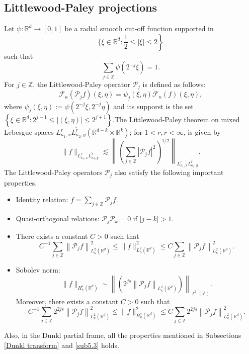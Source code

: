 \documentclass[a4paper,11pt, reqno]{amsart}
\theoremstyle{definition}
\theoremstyle{remark}
\numberwithin{equation}{section}
\newcommand{\K}{\kappa }
\begin{document}
\subsection{Littlewood-Paley projections}\label{L-P section}
Let $\psi: \mathbb{R}^{d} \rightarrow[0,1]$ be a radial smooth cut-off function supported in $$\{ \xi \in\left.\mathbb{R}^{d}  : \frac{1}{2} \leq|\xi | \leq 2\right\}$$ such that
	$$
	\sum_{j \in \mathbb{Z}} \psi\left(2^{-j} \xi \right)=1.
	$$
   For $j \in \mathbb{Z}$, the Littlewood-Paley operator $\mathcal{P}_j$ is defined as follows:
	$$
	\mathcal{F}_\kappa(\mathcal{P}_jf)(\xi,\eta)=\psi_j(\xi,\eta) \mathcal{F}_\kappa(f)(\xi,\eta),
	$$
	where $\psi_j(\xi,\eta):=\psi\left(2^{-j}\xi,2^{-j}\eta\right)$  and its supporst is the set  $\left\{\xi\in \mathbb{R}^d: 2^{j-1} \leq|(\xi,\eta) | \leq 2^{j+1}\right\}$.The Littlewood-Paley theorem  on mixed Lebesgue spaces $L^r_{{\K_1,x}}L^{\tilde{r}}_{\K_2,y}(\mathbb{R}^{d-k} \times \mathbb{R}^k) $; for $1<r, \tilde{r}<\infty$,
	is given by 	\begin{equation} \label{DLP}
	    \|f\|_{L^r_{{\K_1,x}}L^{\tilde{r}}_{\K_2,y} }\lesssim\left\| \left(\sum_{j \in \mathbb{Z}} \left|\mathcal{P}_j f\right|^2\right)^{1 / 2}\right\|_{L^r_{{\K_1,x}}L^{\tilde{r}}_{\K_2,y}} .
	\end{equation}
	The    Littlewood-Paley operators    $\mathcal{P}_j$ also satisfy the following important properties. 
	\begin{itemize}
		\item Identity relation: $f= \displaystyle \sum_{j \in \mathbb{Z}} \mathcal{P}_j f.$
		\item  Quasi-orthogonal relations: $\mathcal{P}_j \mathcal{P}_k=0$ if $|j-k|>1.$
		\item There exists a constant $C>0$ such that $$C^{-1} \sum_{j \in \mathbb{Z}}\left\| \mathcal{P}_j f\right\|_{L_\kappa^2\left(\mathbb{R}^{d}\right)}^2 \leq\|f\|_{L_\kappa^2\left(\mathbb{R}^{d}\right)}^2 \leq C \sum_{j \in \mathbb{Z}}\left\|\mathcal{P}_jf\right\|_{L_\kappa^2\left(\mathbb{R}^{d}\right)}^2.$$
		\item  Sobolev norm: $$\|f\|_{H_\kappa^s\left(\mathbb{R}^{d}\right)}\sim   \left\|(2^{js}\left\| \mathcal{P}_j f\right\|_{L_\kappa^2\left(\mathbb{R}^{d}\right)})\right \|_{\ell^2(\mathbb{Z})} .$$
		Moreover, there exists a constant $C>0$ such that
		$$C^{-1} \sum_{j \in \mathbb{Z}} 2^{2js}\left\| \mathcal{P}_jf\right\|_{L_\kappa^2\left(\mathbb{R}^{d}\right)}^2 \leq\|f\|_{H_\kappa^s\left(\mathbb{R}^{d}\right)}^2 \leq C \sum_{j \in \mathbb{Z}}2^{2js}\left\|\mathcal{P}_j f\right\|_{L_\kappa^2\left(\mathbb{R}^{d}\right)}^2.$$
	\end{itemize}
Also, in the Dunkl partial frame,  all the properties mentioned in Subsections \ref{Dunkl transform} and \ref{sub5.3} holds. 
\end{document}
